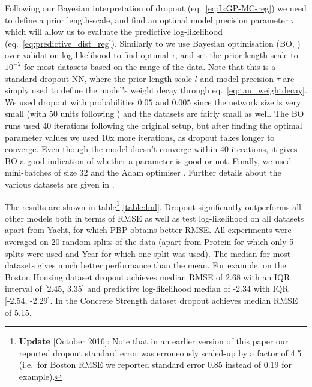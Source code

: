 \documentclass{article}
\theoremstyle{definition}
\begin{document}
Following our Bayesian interpretation of dropout (eq.\ \eqref{eq:L:GP-MC-reg}) we need to define a prior length-scale, and find an optimal model precision parameter $\tau$ which will allow us to evaluate the predictive log-likelihood (eq.\ \eqref{eq:predictive_dist_reg}).
Similarly to \citep{hernandez2015probabilistic} we use Bayesian optimisation (BO,  \citep{snoek2012practical,snoek2015spearmint}) over validation log-likelihood to find optimal $\tau$, and set the prior length-scale to $10^{-2}$ for most datasets based on the range of the data.
Note that this is a standard dropout NN, where the prior length-scale $l$ and model precision $\tau$ are simply used to define the model's weight decay through eq.\ \eqref{eq:tau_weightdecay}.
We used dropout with probabilities $0.05$ and $0.005$ since the network size is very small (with 50 units following \citep{hernandez2015probabilistic}) and the datasets are fairly small as well. 
The BO runs used 40 iterations following the original setup, but after finding the optimal parameter values we used 10x more iterations, as dropout takes longer to converge. Even though the model doesn't converge within 40 iterations, it gives BO a good indication of whether a parameter is good or not. Finally, we used mini-batches of size 32 and the Adam optimiser \citep{kingma2014adam}. %
Further details about the various datasets are given in \citep{hernandez2015probabilistic}.

The results are shown in table\footnote{\textbf{Update} [October 2016]: Note that in an earlier version of this paper our reported dropout standard error was erroneously scaled-up by a factor of 4.5 (i.e.\ for Boston RMSE we reported standard error 0.85 instead of 0.19 for example).} \ref{table:lml}. Dropout significantly outperforms all other models both in terms of RMSE as well as test log-likelihood on all datasets apart from Yacht, for which PBP obtains better RMSE.
All experiments were averaged on 20 random splits of the data (apart from Protein for which only 5 splits were used and Year for which one split was used). 
The median for most datasets gives much better performance than the mean. For example, on the Boston Housing dataset dropout achieves median RMSE of 2.68 with an IQR interval of [2.45, 3.35] and predictive log-likelihood median of  -2.34 with IQR [-2.54, -2.29]. In the Concrete Strength dataset dropout achieves median RMSE of 5.15.
\end{document}
